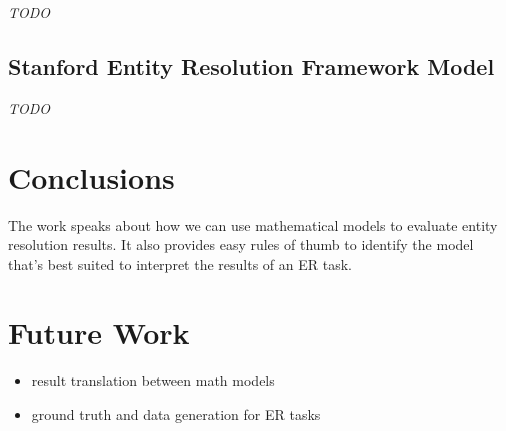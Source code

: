 \documentclass[11pt]{article}
\begin{document}
    \textit{TODO}

    \subsection{Stanford Entity Resolution Framework Model}

    \textit{TODO}

    \section[conclusion]{Conclusions}\label{section:conclusions}

    The work speaks about how we can use mathematical models to evaluate entity resolution results. It also provides easy rules of thumb to identify the model that's best suited to interpret the results of an ER task.
    
    \section[future]{Future Work}\label{section:future}
    \begin{itemize}
        \item result translation between math models
        \item ground truth and data generation for ER tasks
    \end{itemize}


    
\end{document}
